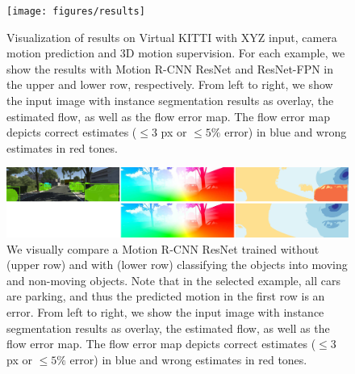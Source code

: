 \begin{figure}[t]
  \centering
  \texttt{[image: figures/results]}
\caption{
Visualization of results on Virtual KITTI with XYZ input, camera motion prediction and 3D motion supervision.
For each example, we show the results with Motion R-CNN ResNet and ResNet-FPN
in the upper and lower row, respectively.
From left to right, we show the input image with instance segmentation results as overlay,
the estimated flow, as well as the flow error map.
The flow error map depicts correct estimates ($\leq 3$ px or $\leq 5\%$ error) in blue and wrong estimates in red tones.
}
\label{figure:vkitti}
\end{figure}

\begin{figure}[t]
  \centering
  \includegraphics[width=\textwidth]{figures/moving}
\caption{
We visually compare a Motion R-CNN ResNet trained without (upper row) and
with (lower row) classifying the objects into moving and non-moving objects.
Note that in the selected example, all cars are parking, and thus the predicted
motion in the first row is an error.
From left to right, we show the input image with instance segmentation results as overlay,
the estimated flow, as well as the flow error map.
The flow error map depicts correct estimates ($\leq 3$ px or $\leq 5\%$ error) in blue and wrong estimates in red tones.
}
\label{figure:moving}
\end{figure}


